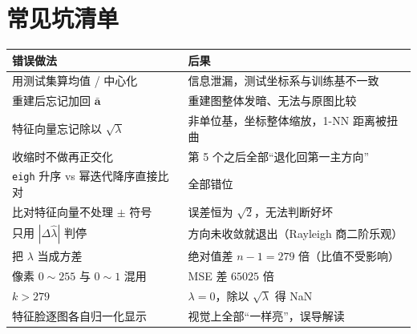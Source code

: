 \section{常见坑清单}

\begin{center}
\begin{tabular}{p{}p{}}
\toprule
\textbf{错误做法} & \textbf{后果} \\
\midrule
用测试集算均值 / 中心化 & 信息泄漏，测试坐标系与训练基不一致 \\
重建后忘记加回 $\bar{\mathbf{a}}$ & 重建图整体发暗、无法与原图比较 \\
特征向量忘记除以 $\sqrt{\lambda}$ & 非单位基，坐标整体缩放，1-NN 距离被扭曲 \\
收缩时不做再正交化 & 第 5 个之后全部“退化回第一主方向” \\
\texttt{eigh} 升序 vs 幂迭代降序直接比对 & 全部错位 \\
比对特征向量不处理 $\pm$ 符号 & 误差恒为 $\sqrt{2}$，无法判断好坏 \\
只用 $|\Delta\hat\lambda|$ 判停 & 方向未收敛就退出（Rayleigh 商二阶乐观）\\
把 $\lambda$ 当成方差 & 绝对值差 $n-1=279$ 倍（比值不受影响）\\
像素 $0\sim255$ 与 $0\sim1$ 混用 & MSE 差 $65025$ 倍 \\
$k>279$ & $\lambda=0$，除以 $\sqrt{\lambda}$ 得 NaN \\
特征脸逐图各自归一化显示 & 视觉上全部“一样亮”，误导解读 \\
\bottomrule
\end{tabular}
\end{center}
